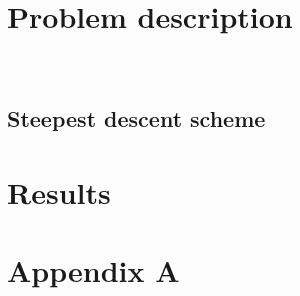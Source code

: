 \documentclass{article}
\begin{document}

\newpage
\tableofcontents
\newpage
\section{Problem description}



\\
\newpage
\subsection{Steepest descent scheme}

\section{Results}





\newpage
%
\newpage
%
\newpage
%
\newpage

%

\newpage
\section*{Appendix A}
\appendix

\end{document}

